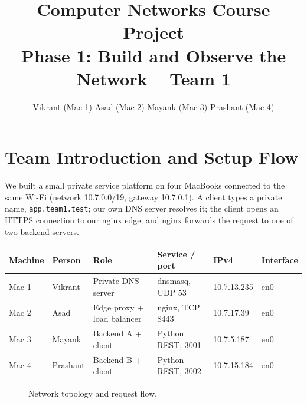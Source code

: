 \documentclass[11pt,a4paper]{article}
\title{Computer Networks Course Project\\[2pt]
\large Phase 1: Build and Observe the Network -- Team 1}
\author{Vikrant (Mac 1) \quad Asad (Mac 2) \quad Mayank (Mac 3) \quad Prashant (Mac 4)}
\date{}
\begin{document}
\maketitle

\section{Team Introduction and Setup Flow}

We built a small private service platform on four MacBooks connected to the same Wi-Fi
(network 10.7.0.0/19, gateway 10.7.0.1). A client types a private name,
\texttt{app.team1.test}; our own DNS server resolves it; the client opens an HTTPS
connection to our nginx edge; and nginx forwards the request to one of two backend servers.

\begin{table}[H]
\centering
\begin{tabular}{llllll}
\toprule
Machine & Person & Role & Service / port & IPv4 & Interface \\
\midrule
Mac 1 & Vikrant  & Private DNS server        & dnsmasq, UDP 53   & 10.7.13.235 & en0 \\
Mac 2 & Asad     & Edge proxy + load balancer & nginx, TCP 8443   & 10.7.17.39  & en0 \\
Mac 3 & Mayank   & Backend A + client        & Python REST, 3001 & 10.7.5.187  & en0 \\
Mac 4 & Prashant & Backend B + client        & Python REST, 3002 & 10.7.15.184 & en0 \\
\bottomrule
\end{tabular}
\end{table}

\begin{figure}[H]
\centering
{}
\caption{Network topology and request flow.}
\end{figure}
\end{document}
